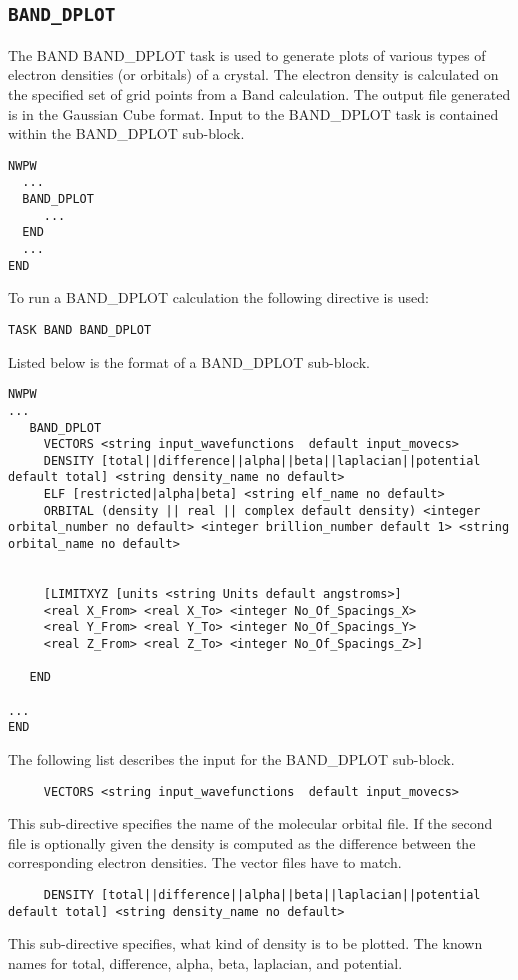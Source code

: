\subsection{\tt BAND\_DPLOT}
\label{sec:pspw_dplot}
The BAND BAND\_DPLOT task is used to generate plots of various types of electron
densities (or orbitals) of a crystal.  The electron density is calculated on the
specified set of grid points from a Band calculation.  The output file
generated is in the Gaussian Cube format.
Input to the BAND\_DPLOT task is contained
within the BAND\_DPLOT sub-block.
\begin{verbatim}
NWPW
  ...
  BAND_DPLOT
     ...
  END
  ...
END
\end{verbatim}
To run a BAND\_DPLOT calculation the following directive
is used:
\begin{verbatim}
TASK BAND BAND_DPLOT
\end{verbatim}
Listed below is the format of a BAND\_DPLOT sub-block.
\begin{verbatim}
NWPW
...
   BAND_DPLOT
     VECTORS <string input_wavefunctions  default input_movecs>
     DENSITY [total||difference||alpha||beta||laplacian||potential default total] <string density_name no default>
     ELF [restricted|alpha|beta] <string elf_name no default>
     ORBITAL (density || real || complex default density) <integer orbital_number no default> <integer brillion_number default 1> <string orbital_name no default>


     [LIMITXYZ [units <string Units default angstroms>]
     <real X_From> <real X_To> <integer No_Of_Spacings_X>
     <real Y_From> <real Y_To> <integer No_Of_Spacings_Y>
     <real Z_From> <real Z_To> <integer No_Of_Spacings_Z>]

   END

...
END
\end{verbatim}

The following list describes the input for the BAND\_DPLOT
sub-block.

\begin{verbatim}
     VECTORS <string input_wavefunctions  default input_movecs>
\end{verbatim}
 This sub-directive specifies the name of the molecular orbital file. If the second file is optionally given the density is computed as the difference between the corresponding electron densities. The vector files have to match.

\begin{verbatim}
     DENSITY [total||difference||alpha||beta||laplacian||potential default total] <string density_name no default>
\end{verbatim}
This sub-directive specifies, what kind of density is to be plotted. The known names for total, difference, alpha, beta, laplacian, and potential.

